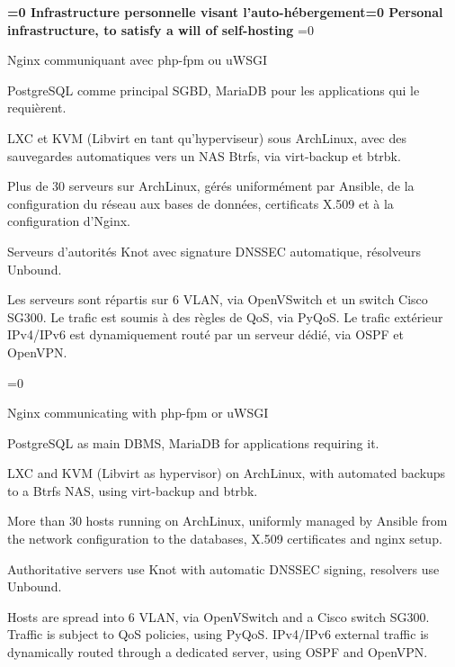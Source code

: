\documentclass[11pt,a4paper,sans]{moderncv}
\newcommand{\babelFR}[1]{\ifnum\pdfstrcmp{\languagename}{french}=0 {#1}\fi}
\newcommand{\babelEN}[1]{\ifnum\pdfstrcmp{\languagename}{english}=0 {#1}\fi}
\begin{document}
{\textbf{\babelFR{Infrastructure personnelle visant l'auto-hébergement}\babelEN{Personal infrastructure, to satisfy a will of self-hosting}}%
\babelFR{
    \begin{description}[nolistsep]
        \item[Web:] Nginx communiquant avec php-fpm ou uWSGI
        \item[SGBD:] PostgreSQL comme principal SGBD, MariaDB pour
            les applications qui le requièrent.
        \item[Hyperviseur:] LXC et KVM (Libvirt en tant qu'hyperviseur) sous
            ArchLinux, avec des sauvegardes automatiques vers un NAS Btrfs, via
            virt-backup et btrbk.
        \item [Orchestration:] Plus de 30 serveurs sur ArchLinux, gérés
            uniformément par Ansible, de la configuration du réseau aux bases
            de données, certificats X.509 et à la configuration d'Nginx.
        \item[DNS:] Serveurs d'autorités Knot avec signature DNSSEC
            automatique, résolveurs Unbound.
        \item [Réseau:] Les serveurs sont répartis sur 6 VLAN, via OpenVSwitch
            et un switch Cisco SG300. Le trafic est soumis à des règles de QoS,
            via PyQoS. Le trafic extérieur IPv4/IPv6 est dynamiquement routé
            par un serveur dédié, via OSPF et OpenVPN.
    \end{description}
}%
\babelEN{%
    \begin{description}[nolistsep]
        \item[Web:] Nginx communicating with php-fpm or uWSGI
        \item[Databases:] PostgreSQL as main DBMS, MariaDB for applications
            requiring it.
        \item[Hypervisor:] LXC and KVM (Libvirt as hypervisor) on ArchLinux,
            with automated backups to a Btrfs NAS, using virt-backup and btrbk.
        \item [Management:] More than 30 hosts running on ArchLinux, uniformly
            managed by Ansible from the network configuration to the
            databases, X.509 certificates and nginx setup.
        \item[DNS:] Authoritative servers use Knot with automatic DNSSEC
            signing, resolvers use Unbound.
        \item [Network:] Hosts are spread into 6 VLAN, via OpenVSwitch
            and a Cisco switch SG300. Traffic is subject to QoS policies, using
            PyQoS. IPv4/IPv6 external traffic is dynamically routed through a
            dedicated server, using OSPF and OpenVPN.
    \end{description}
}}
\vspace{-1em}
\end{document}
